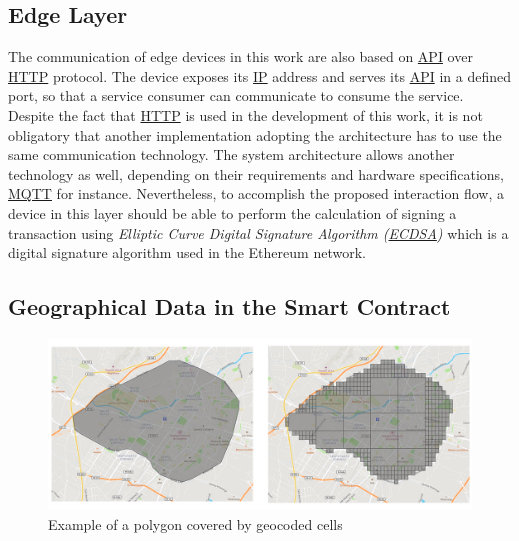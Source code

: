 \subsection{Edge Layer} \label{Methdology-Architecture-RMS-Edge}

\npara The communication of edge devices in this work are also based on \hyperref[Acronym-API]{API} over \hyperref[Acronym-HTTP]{HTTP} protocol.
The device exposes its \hyperref[Acronym-IP]{IP} address and serves its \hyperref[Acronym-API]{API} in a defined port, so that a service consumer can communicate to consume the service.
Despite the fact that \hyperref[Acronym-HTTP]{HTTP} is used in the development of this work, it is not obligatory that another implementation adopting the architecture has to use the same communication technology.
The system architecture allows another technology as well, depending on their requirements and hardware specifications, \hyperref[Acronym-MQTT]{MQTT} for instance.
Nevertheless, to accomplish the proposed interaction flow, a device in this layer should be able to perform the calculation of signing a transaction using \textit{Elliptic Curve Digital Signature Algorithm (\hyperref[Acronym-ECDSA]{ECDSA})} which is a digital signature algorithm used in the Ethereum network.

\subsection{Geographical Data in the Smart Contract} \label{Methodology-SpatialSmartContract}

\begin{figure}[htb!]
    \centering
    \includegraphics[width=\textwidth]{images/PolygonAndGeohashes.png}
    \caption{Example of a polygon covered by geocoded cells}
    \label{fig:PolygonAndGeohashes}
\end{figure}

